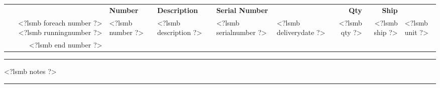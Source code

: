 \documentclass{scrartcl}
\begin{document}
\begin{tabularx}{\textwidth}{@{}rlXllrrl@{}}
\vspace{1cm}
  
\begin{tabularx}{\textwidth}{@{}rlXllrrl@{}}
  \textbf{Item} & \textbf{Number} & \textbf{Description} & \textbf{Serial Number} & & \textbf{Qty} & \textbf{Ship} & \\

<?lsmb foreach number ?>
  <?lsmb runningnumber ?> & <?lsmb number ?> & <?lsmb description ?> & <?lsmb serialnumber ?> &
  <?lsmb deliverydate ?> & <?lsmb qty ?> & <?lsmb ship ?> & <?lsmb unit ?> \\
<?lsmb end number ?>
\end{tabularx}


\parbox{\textwidth}{
\rule{\textwidth}{2pt}

\vspace{12pt}

<?lsmb notes ?>

}

\vfill

\rule{\textwidth}{0.5pt}

\usebox{\ftr}
\end{document}
